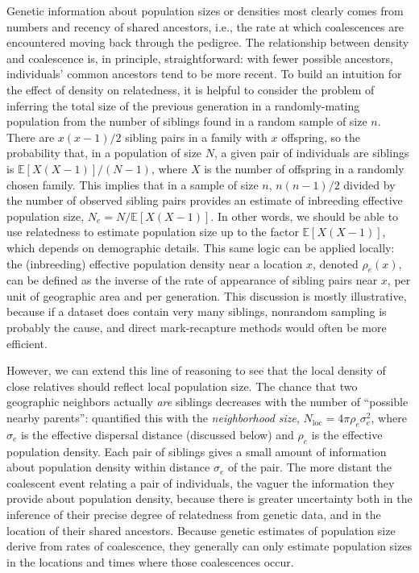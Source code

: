 \documentclass{ar-1col}
\newcommand{\E}{\mathbb{E}}
\begin{document}
Genetic information about population sizes or densities most clearly
comes from numbers and recency of shared ancestors, 
i.e., the rate at which coalescences are encountered moving back through the pedigree.
The relationship between density and coalescence is, in principle, straightforward:
with fewer possible ancestors,
individuals' common ancestors tend to be more recent.
To build an intuition for the effect of density on relatedness,
it is helpful to consider 
the problem of inferring the total size of the previous generation
in a randomly-mating population
from the number of siblings found in a random sample of size $n$.
There are $x (x-1) / 2$ sibling pairs in a family with $x$ offspring,
so the probability that, 
in a population of size $N$, 
a given pair of individuals are siblings
is $\E[X (X-1)] / (N-1)$, where $X$ is the number of offspring in a randomly chosen family.
This implies that in a sample of size $n$,
$n(n-1)/2$ divided by the number of observed sibling pairs 
provides an estimate of inbreeding effective population size, $N_e = N/\E[X(X-1)]$.
In other words, we should be able to use relatedness to estimate population size
up to the factor $\E[X(X-1)]$, which depends on demographic details. 
This same logic can be applied locally:
the (inbreeding) effective population density
near a location $x$, denoted $\rho_e(x)$,
can be defined as the inverse of the rate of appearance of sibling pairs
near $x$, per unit of geographic area and per generation.
This discussion is mostly illustrative, because
if a dataset does contain very many siblings,
nonrandom sampling is probably the cause,
and direct mark-recapture methods would often be more efficient.

However, we can extend this line of reasoning to see that 
the local density of close relatives
should reflect local population size.
The chance that two geographic neighbors actually \textit{are} siblings 
decreases with the number of ``possible nearby parents'':
\citet{wright1946isolation} quantified this with the
\emph{neighborhood size}, 
$N_\text{loc} = 4 \pi \rho_e \sigma_e^2$,
where $\sigma_e$ is the effective dispersal distance (discussed below)
and $\rho_e$ is the effective population density.
Each pair of siblings gives a small amount of information
about population density within distance $\sigma_e$ of the pair.
The more distant the coalescent event relating a pair of individuals, 
the vaguer the information they provide about population density,
because there is greater uncertainty 
both in the inference of their precise degree of relatedness from genetic data,
and in the location of their shared ancestors.
Because genetic estimates of population size 
derive from rates of coalescence,
they generally can only estimate population sizes 
in the locations and times where those coalescences occur.
\end{document}
